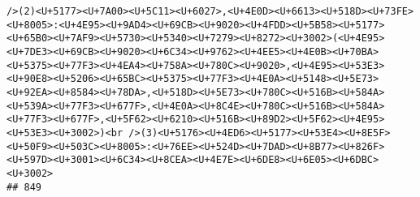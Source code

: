 \documentclass[
]{article}
\begin{document}
\begin{verbatim}
/>(2)<U+5177><U+7A00><U+5C11><U+6027>,<U+4E0D><U+6613><U+518D><U+73FE><U+8005>:<U+4E95><U+9AD4><U+69CB><U+9020><U+4FDD><U+5B58><U+5177><U+65B0><U+7AF9><U+5730><U+5340><U+7279><U+8272><U+3002>(<U+4E95><U+7DE3><U+69CB><U+9020><U+6C34><U+9762><U+4EE5><U+4E0B><U+70BA><U+5375><U+77F3><U+4EA4><U+758A><U+780C><U+9020>,<U+4E95><U+53E3><U+90E8><U+5206><U+65BC><U+5375><U+77F3><U+4E0A><U+5148><U+5E73><U+92EA><U+8584><U+78DA>,<U+518D><U+5E73><U+780C><U+516B><U+584A><U+539A><U+77F3><U+677F>,<U+4E0A><U+8C4E><U+780C><U+516B><U+584A><U+77F3><U+677F>,<U+5F62><U+6210><U+516B><U+89D2><U+5F62><U+4E95><U+53E3><U+3002>)<br />(3)<U+5176><U+4ED6><U+5177><U+53E4><U+8E5F><U+50F9><U+503C><U+8005>:<U+76EE><U+524D><U+7DAD><U+8B77><U+826F><U+597D><U+3001><U+6C34><U+8CEA><U+4E7E><U+6DE8><U+6E05><U+6DBC><U+3002>
## 849                                                                                                                                                                                                                                                                                                                                                                                                                                                                                                                                                                                                                                                                                                                                                                                                                                                                                                                                                                                                                                                                                                                                                                                                                                                                                                                                                                                                                                                                                                                                                                                                                                                                                                                                                                                                                                                                                                                                                                                                                                                                                                                                                                                                                                                                                                                                                                                                                                                                                                                                                                                                                         
\end{verbatim}
\end{document}
